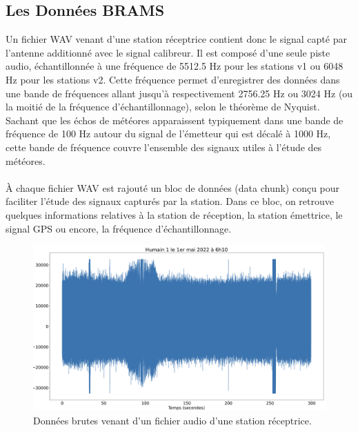 \documentclass[11pt]{article}
\begin{document}


\subsection{Les Données BRAMS}

Un fichier WAV venant d'une station réceptrice contient donc le signal capté par l'antenne additionné avec le signal calibreur.
Il est composé d'une seule piste audio, échantillonnée à une fréquence de 5512.5 Hz pour les stations v1 ou 6048 Hz pour les stations v2.
Cette fréquence permet d'enregistrer des données dans une bande de fréquences allant jusqu'à respectivement 2756.25 Hz ou 3024 Hz (ou la moitié de la fréquence d'échantillonnage), selon le théorème de Nyquist.
Sachant que les échos de météores apparaissent typiquement dans une bande de fréquence de 100 Hz autour du signal de l'émetteur qui est décalé à 1000 Hz, cette bande de fréquence couvre l'ensemble des signaux utiles à l'étude des météores.\\
\\
À chaque fichier WAV est rajouté un bloc de données (data chunk) conçu pour faciliter l'étude des signaux capturés par la station.
Dans ce bloc, on retrouve quelques informations relatives à la station de réception, la station émettrice, le signal GPS ou encore, la fréquence d'échantillonnage.

\begin{figure}[h]
    \begin{center}
        \includegraphics[scale=0.155]{wav_brut.png}
        \caption{Données brutes venant d'un fichier audio d'une station réceptrice.}
        \label{fig:wav_brut}
    \end{center}
\end{figure}
\end{document}
